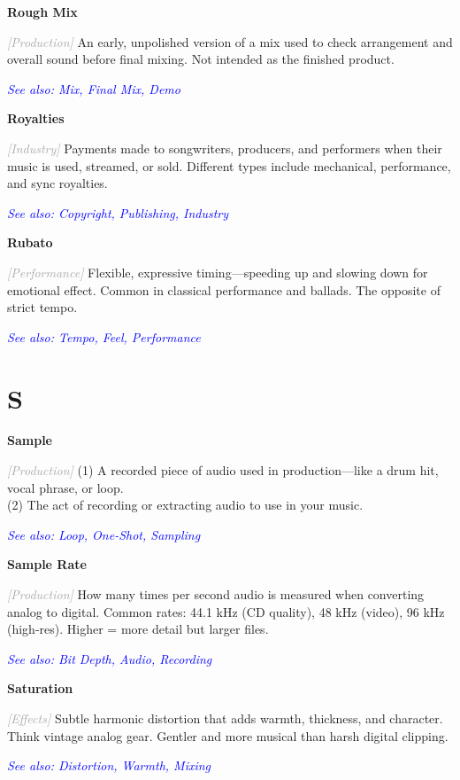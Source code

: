 \documentclass[11pt,letterpaper]{article}
\newcommand{\term}[1]{\textbf{\large\color{purple}#1}}
\newcommand{\category}[1]{\textcolor{darkgray}{\textit{\small [#1]}}}
\newcommand{\seealso}[1]{\textcolor{blue}{\textit{See also: #1}}}
\newenvironment{termdef}[1]
  {\noindent\term{#1}\par\nopagebreak}
  {\par\vspace{0.3em}}
\begin{document}
\begin{termdef}{Rough Mix}
\category{Production}
An early, unpolished version of a mix used to check arrangement and overall sound before final mixing. Not intended as the finished product.

\seealso{Mix, Final Mix, Demo}
\end{termdef}

\begin{termdef}{Royalties}
\category{Industry}
Payments made to songwriters, producers, and performers when their music is used, streamed, or sold. Different types include mechanical, performance, and sync royalties.

\seealso{Copyright, Publishing, Industry}
\end{termdef}

\begin{termdef}{Rubato}
\category{Performance}
Flexible, expressive timing—speeding up and slowing down for emotional effect. Common in classical performance and ballads. The opposite of strict tempo.

\seealso{Tempo, Feel, Performance}
\end{termdef}

\newpage

\section*{S}

\begin{termdef}{Sample}
\category{Production}
(1) A recorded piece of audio used in production—like a drum hit, vocal phrase, or loop. \\
(2) The act of recording or extracting audio to use in your music.

\seealso{Loop, One-Shot, Sampling}
\end{termdef}

\begin{termdef}{Sample Rate}
\category{Production}
How many times per second audio is measured when converting analog to digital. Common rates: 44.1 kHz (CD quality), 48 kHz (video), 96 kHz (high-res). Higher = more detail but larger files.

\seealso{Bit Depth, Audio, Recording}
\end{termdef}

\begin{termdef}{Saturation}
\category{Effects}
Subtle harmonic distortion that adds warmth, thickness, and character. Think vintage analog gear. Gentler and more musical than harsh digital clipping.

\seealso{Distortion, Warmth, Mixing}
\end{termdef}
\end{document}
